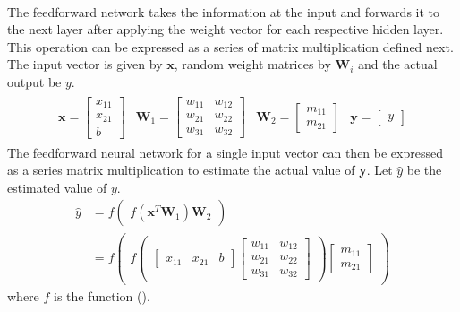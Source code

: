 \vspace{20mm} \\
The feedforward network takes the information at the input and forwards it to the next layer after applying the weight vector for each respective hidden layer. This operation can be expressed as a series of matrix multiplication defined next. The input vector is given by $\textbf{x}$, random weight matrices by $\textbf{W}_i$ and the actual output be ${y}$.
\begin{align}
  \begin{matrix}
    \textbf{x} = \begin{bmatrix}
      x_{11} \\
      x_{21} \\
      b
    \end{bmatrix} & \textbf{W}_1 = \begin{bmatrix}
      w_{11} & w_{12} \\
      w_{21} & w_{22} \\
      w_{31} & w_{32}
    \end{bmatrix} & \textbf{W}_2 = \begin{bmatrix}
      m_{11} \\
      m_{21} 
    \end{bmatrix} &
    \textbf{y} = \begin{bmatrix}
      y
    \end{bmatrix}  
  \end{matrix}
\end{align}
The feedforward neural network for a single input vector can then be expressed as a series matrix multiplication to estimate the actual value of \textbf{y}. Let $\widehat{{y}}$ be the estimated value of ${y}$.
\begin{align}
  \widehat{{y}} &= f\begin{pmatrix}f(\textbf{x}^T\textbf{W}_1)\textbf{W}_2 \end{pmatrix} \nonumber\\
  &=f\begin{pmatrix}
    f\begin{pmatrix}\begin{bmatrix}
      x_{11} & x_{21} & b
    \end{bmatrix} \begin{bmatrix}
      w_{11} & w_{12} \\
      w_{21} & w_{22} \\
      w_{31} & w_{32} 
    \end{bmatrix}
  \end{pmatrix}\begin{bmatrix}
    m_{11} \\
    m_{21} 
  \end{bmatrix}
\end{pmatrix}
\label{neural_net_def}  
\end{align}
where $f$ is the function ().
